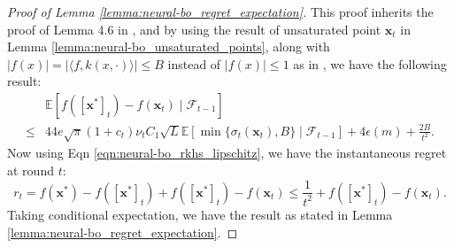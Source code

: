 \begin{proof} [Proof of Lemma \ref{lemma:neural-bo_regret_expectation}]
     
This proof inherits the proof of Lemma 4.6 in \citet{zhang2021neural}, and by using the result of unsaturated point $\mathbf{x}_t$ in Lemma \ref{lemma:neural-bo_unsaturated_points}, along with $\lvert f(x)  \rvert = \lvert \langle f, k(x,\cdot) \rangle \rvert \leq B$ instead of $\lvert f(x) \rvert  \leq 1$ as in \citet{zhang2021neural}, we have the following result:
\begin{equation*}
\begin{split}
    &  \mathbb{E} [f([\mathbf{x}^*]_t) - f(\mathbf{x}_t) \mid \mathcal{F}_{t-1}] \\
    \leq  & 44e\sqrt{\pi}(1+c_t )\nu_t C_1\sqrt {L} \mathbb{E}[\min \{\sigma_t(\mathbf{x}_t),B\} \mid \mathcal{F}_{t-1}] + 4\epsilon(m) + \frac{2B}{t^2}.
\end{split}
\end{equation*}
Now using Eqn \ref{eqn:neural-bo_rkhs_lipschitz}, we have the instantaneous regret at round $t$:
\[
r_t = f(\mathbf{x}^*) - f([\mathbf{x}^*]_t) + f([\mathbf{x}^*]_t) - f(\mathbf{x}_t) \leq \frac{1}{t^2} + f([\mathbf{x}^*]_t) - f(\mathbf{x}_t).
\]
Taking conditional expectation, we have the result as stated in Lemma \ref{lemma:neural-bo_regret_expectation}.
\end{proof}

